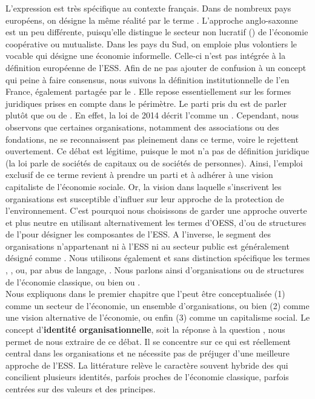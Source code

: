 L'expression  est très spécifique au contexte français. Dans de nombreux pays européens, on désigne la même réalité par le terme . L'approche anglo-saxonne est un peu différente, puisqu'elle distingue le secteur non lucratif () de l'économie coopérative ou mutualiste. Dans les pays du Sud, on emploie plus volontiers le vocable  qui désigne une économie informelle. Celle-ci n'est pas intégrée à la définition européenne de l'ESS. Afin de ne pas ajouter de confusion à un concept qui peine à faire consensus, nous suivons la définition institutionnelle de l'\ess en France, également partagée par le \cncres \parencite{cncres2015panorama}. Elle repose essentiellement sur les formes juridiques prises en compte dans le périmètre. Le parti pris du \cncres est de parler  plutôt que  ou de . En effet, la loi de 2014 décrit l'\ess comme un . Cependant, nous observons que certaines organisations, notamment des associations ou des fondations, ne se reconnaissent pas pleinement dans ce terme, voire le rejettent ouvertement. Ce débat est légitime, puisque le mot  n'a pas de définition juridique (la loi parle de sociétés de capitaux ou de sociétés de personnes). Ainsi, l'emploi exclusif de ce terme revient à prendre un parti et à adhérer à une vision capitaliste de l'économie sociale. Or, la vision dans laquelle s'inscrivent les organisations est susceptible d'influer sur leur approche de la protection de l'environnement. C'est pourquoi nous choisissons de garder une approche ouverte et plus neutre en utilisant alternativement les termes d'OESS, d'\eess ou de structures de l'\ess pour désigner les composantes de l'ESS. A l'inverse, le segment des organisations n'appartenant ni à l'ESS ni au secteur public est généralement désigné comme \textbf{}. Nous utilisons également et sans distinction spécifique les termes , ,  ou, par abus de langage, . Nous parlons ainsi d'organisations ou de structures de l'économie classique, ou bien  ou . \\

Nous expliquons dans le premier chapitre que l'\ess peut être conceptualisée (1) comme un secteur de l'économie, un ensemble d'organisations, ou bien (2) comme une vision alternative de l'économie, ou enfin (3) comme un capitalisme social. Le concept d'\textbf{identité organisationnelle}, soit la réponse à la question , nous permet de nous extraire de ce débat. Il se concentre sur ce qui est réellement central dans les organisations et ne nécessite pas de préjuger d'une meilleure approche de l'ESS. La littérature relève le caractère souvent hybride des \oess qui concilient plusieurs identités, parfois proches de l'économie classique, parfois centrées sur des valeurs et des principes. \\


